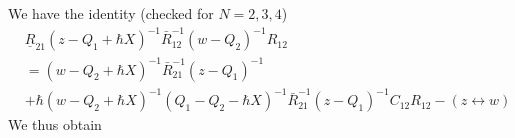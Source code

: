 \documentclass[11pt]{report}
\theoremstyle{definition}
\theoremstyle{remark}
\theoremstyle{remark}
\begin{document}
We have the identity (checked for $N=2,3,4$)
\begin{align*}
&\underline{R}_{21} (z-Q_1+\hbar X)^{-1} \bar R_{12}^{-1} (w-Q_2)^{-1} R_{12} \\
&= (w-Q_2+\hbar X)^{-1} \bar R_{21}^{-1} (z-Q_1)^{-1} \\
&+ \hbar (w-Q_2+\hbar X)^{-1} (Q_1-Q_2-\hbar X)^{-1} \bar R_{21}^{-1} (z-Q_1)^{-1} C_{12} R_{12} - (z \leftrightarrow w)
\end{align*}
We thus obtain
\end{document}
